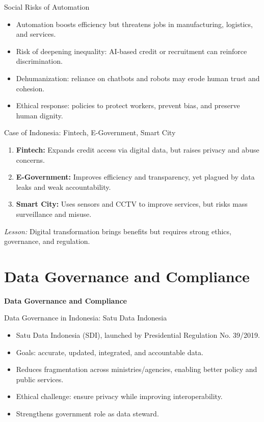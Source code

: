 \documentclass[aspectratio=169, table]{beamer}
\begin{document}
\begin{frame}{Social Risks of Automation}
	\vspace{20pt}
	\begin{itemize}
		\item Automation boosts efficiency but threatens jobs in manufacturing, logistics, and services.  
		\item Risk of deepening inequality: AI-based credit or recruitment can reinforce discrimination.  
		\item Dehumanization: reliance on chatbots and robots may erode human trust and cohesion.  
		\item Ethical response: policies to protect workers, prevent bias, and preserve human dignity.  
	\end{itemize}
\end{frame}

\begin{frame}{\LARGE{Case of Indonesia: Fintech, E-Government, Smart City}}
	\vspace{20pt}
	\begin{enumerate}
		\item \textbf{Fintech:} Expands credit access via digital data, but raises privacy and abuse concerns.  
		\item \textbf{E-Government:} Improves efficiency and transparency, yet plagued by data leaks and weak accountability.  
		\item \textbf{Smart City:} Uses sensors and CCTV to improve services, but risks mass surveillance and misuse.  
	\end{enumerate}
	\textit{Lesson:} Digital transformation brings benefits but requires strong ethics, governance, and regulation.  
\end{frame}

\section{Data Governance and Compliance}

\begin{frame}{\hfill}
	\centering
	\Huge{\textbf{Data Governance and Compliance}}
\end{frame}

\begin{frame}{\LARGE{Data Governance in Indonesia: Satu Data Indonesia}}
	\vspace{20pt}
	\begin{itemize}
		\item Satu Data Indonesia (SDI), launched by Presidential Regulation No. 39/2019.  
		\item Goals: accurate, updated, integrated, and accountable data.  
		\item Reduces fragmentation across ministries/agencies, enabling better policy and public services.  
		\item Ethical challenge: ensure privacy while improving interoperability.  
		\item Strengthens government role as data steward.  
	\end{itemize}
\end{frame}
\end{document}
